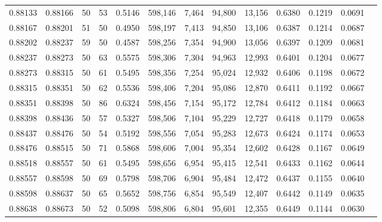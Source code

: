 \begin{tabular}{rrrrrrrrrrrrr}
0.88133 & 0.88166 &    50 &  53 &                                     0.5146 & 598,146 &   7,464 &  94,800 &  13,156 & 0.6380 & 0.1219 & 0.0691 \\
0.88167 & 0.88201 &    51 &  50 &                                     0.4950 & 598,197 &   7,413 &  94,850 &  13,106 & 0.6387 & 0.1214 & 0.0687 \\
0.88202 & 0.88237 &    59 &  50 &                                     0.4587 & 598,256 &   7,354 &  94,900 &  13,056 & 0.6397 & 0.1209 & 0.0681 \\
0.88237 & 0.88273 &    50 &  63 &                                     0.5575 & 598,306 &   7,304 &  94,963 &  12,993 & 0.6401 & 0.1204 & 0.0677 \\
0.88273 & 0.88315 &    50 &  61 &                                     0.5495 & 598,356 &   7,254 &  95,024 &  12,932 & 0.6406 & 0.1198 & 0.0672 \\
0.88315 & 0.88351 &    50 &  62 &                                     0.5536 & 598,406 &   7,204 &  95,086 &  12,870 & 0.6411 & 0.1192 & 0.0667 \\
0.88351 & 0.88398 &    50 &  86 &                                     0.6324 & 598,456 &   7,154 &  95,172 &  12,784 & 0.6412 & 0.1184 & 0.0663 \\
0.88398 & 0.88436 &    50 &  57 &                                     0.5327 & 598,506 &   7,104 &  95,229 &  12,727 & 0.6418 & 0.1179 & 0.0658 \\
0.88437 & 0.88476 &    50 &  54 &                                     0.5192 & 598,556 &   7,054 &  95,283 &  12,673 & 0.6424 & 0.1174 & 0.0653 \\
0.88476 & 0.88515 &    50 &  71 &                                     0.5868 & 598,606 &   7,004 &  95,354 &  12,602 & 0.6428 & 0.1167 & 0.0649 \\
0.88518 & 0.88557 &    50 &  61 &                                     0.5495 & 598,656 &   6,954 &  95,415 &  12,541 & 0.6433 & 0.1162 & 0.0644 \\
0.88557 & 0.88598 &    50 &  69 &                                     0.5798 & 598,706 &   6,904 &  95,484 &  12,472 & 0.6437 & 0.1155 & 0.0640 \\
0.88598 & 0.88637 &    50 &  65 &                                     0.5652 & 598,756 &   6,854 &  95,549 &  12,407 & 0.6442 & 0.1149 & 0.0635 \\
0.88638 & 0.88673 &    50 &  52 &                                     0.5098 & 598,806 &   6,804 &  95,601 &  12,355 & 0.6449 & 0.1144 & 0.0630 \\

\end{tabular}
